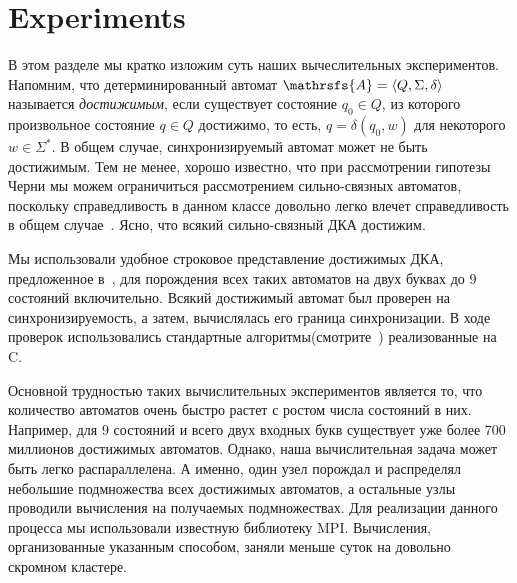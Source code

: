 \documentclass[11pt]{article}
\newcommand{\san}{synchronizing automaton}
\begin{document}
\section{Experiments}
\label{experiments}
В этом разделе мы кратко изложим суть наших вычеслительных экспериментов.
Напомним, что детерминированный автомат $\mathrsfs{A}=\langle Q,\Sigma,\delta\rangle$ называется
\emph{достижимым}, если существует состояние $q_0\in Q$, из которого произвольное состояние 
$q\in Q$ достижимо, то есть, $q=\delta(q_0,w)$ для некоторого $w\in\Sigma^*$. В общем случае,
синхронизируемый автомат может не быть достижимым. Тем не менее, хорошо известно,
что при рассмотрении гипотезы Черни мы можем ограничиться рассмотрением сильно-связных автоматов,
поскольку справедливость в данном классе довольно легко влечет справедливость в общем
случае~\cite{Pi78}. Ясно, что всякий сильно-связный ДКА достижим.



Мы использовали удобное строковое представление достижимых ДКА, предложенное
в~\cite{AMR}, для порождения всех таких автоматов на двух буквах до 9 состояний
включительно. Всякий достижимый автомат был проверен на синхронизируемость, а
затем, вычислялась его граница синхронизации. В ходе проверок использовались
стандартные алгоритмы(смотрите~\cite{Sa05,Vo08}) реализованные на C.


Основной трудностью таких вычислительных экспериментов является то, что количество
автоматов очень быстро растет с ростом числа состояний в них. Например, для 9 состояний
и всего двух входных букв существует уже более 700 миллионов достижимых автоматов.
Однако, наша вычислительная задача может быть легко распараллелена. А именно,
один узел порождал и распределял небольшие подмножества всех достижимых автоматов, а остальные
узлы проводили вычисления на получаемых подмножествах. Для реализации данного процесса
мы использовали известную библиотеку MPI. Вычисления, организованные указанным способом,
заняли меньше суток на довольно скромном кластере.
\end{document}
